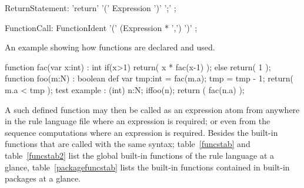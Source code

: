 \begin{rail}
  ReturnStatement: 'return' '(' Expression ')' ';' ;
\end{rail}

\begin{rail}
  FunctionCall: FunctionIdent '(' (Expression * ',') ')' ;
\end{rail}

\begin{example}
An example showing how functions are declared and used.
  \begin{grgen}
function fac(var x:int) : int
{
	if(x>1) {
		return( x * fac(x-1) );
	} else {
		return( 1 );
	}
}
function foo(m:N) : boolean
{
	def var tmp:int = fac(m.a);
	tmp = tmp - 1;
	return( m.a < tmp );
}
test example : (int)
{
	n:N;
	if{foo(n);}
	return ( fac(n.a) );
}
  \end{grgen}
\end{example}

A such defined function may then be called as an expression atom from anywhere in the rule language file where an expression is required; or even from the sequence computations where an expression is required.
Besides the built-in functions that are called with the same syntax;
table~\ref{funcstab} and table~\ref{funcstab2} list the global built-in functions of the rule language at a glance,
table~\ref{packagefuncstab} lists the built-in functions contained in built-in packages at a glance.

